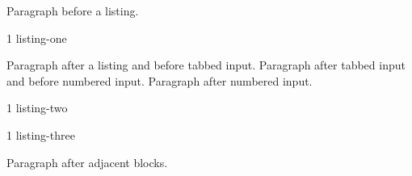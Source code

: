 \documentclass{article}
\begin{document}
Paragraph before a listing.
\begin{listing}{1}
listing-one
\end{listing}
Paragraph after a listing and before tabbed input.
Paragraph after tabbed input and before numbered input.
Paragraph after numbered input.
\begin{listing}{1}
listing-two
\end{listing}
\begin{listing}{1}
listing-three
\end{listing}
Paragraph after adjacent blocks.
\end{document}
